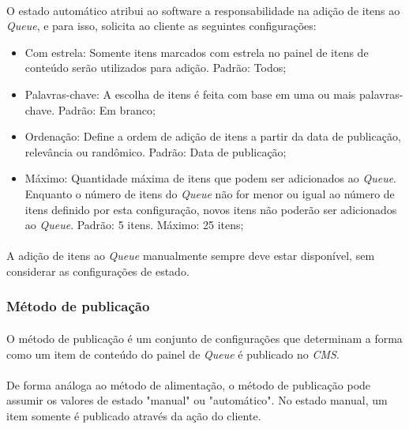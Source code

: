 \documentclass[a4paper,12pt]{article}
\def\cms{\emph{CMS}}
\def\queue{\emph{Queue}}
\begin{document}
\paragraph{}
O estado automático atribui ao software a responsabilidade na adição de itens
ao \queue{}, e para isso, solicita ao cliente as seguintes configurações:

\begin{itemize}

\item Com estrela: Somente itens marcados com estrela no painel de itens de
conteúdo serão utilizados para adição. Padrão: Todos;

\item Palavras-chave: A escolha de itens é feita com base em uma ou mais
palavras-chave. Padrão: Em branco;

\item Ordenação: Define a ordem de adição de itens a partir da data de
publicação, relevância ou randômico. Padrão: Data de publicação;

\item Máximo: Quantidade máxima de itens que podem ser adicionados ao \queue{}.
Enquanto o número de itens do \queue{} não for menor ou igual ao número de
itens definido por esta configuração, novos itens não poderão ser adicionados
ao \queue{}. Padrão: 5 itens. Máximo: 25 itens;

\end{itemize}

\paragraph{}
A adição de itens ao \queue{} manualmente sempre deve estar disponível, sem
considerar as configurações de estado.

\subsubsection{Método de publicação} \label{metodopublicacao}

\paragraph{}
O método de publicação é um conjunto de configurações que determinam a forma
como um item de conteúdo do painel de \queue{} é publicado no \cms{}.

\paragraph{}
De forma análoga ao método de alimentação, o método de publicação pode assumir
os valores de estado "manual" ou "automático". No estado manual, um item
somente é publicado através da ação do cliente.
\end{document}
